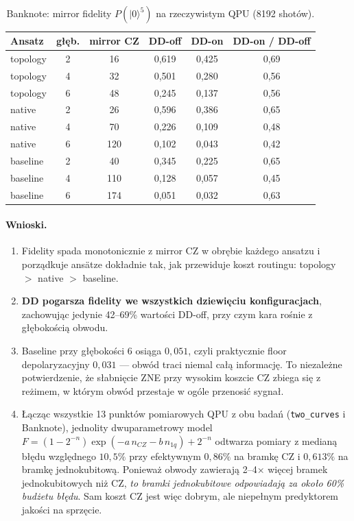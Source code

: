 \documentclass[11pt,a4paper]{article}
\begin{document}
\begin{table}[htbp]
\centering
\caption{Banknote: mirror fidelity $P(|0\rangle^{5})$ na rzeczywistym QPU (8192 shotów).}
\begin{tabular}{@{}lccc cc@{}}
\toprule
Ansatz & głęb. & mirror CZ & DD-off & DD-on & DD-on / DD-off \\
\midrule
topology & 2 & 16  & 0,619 & 0,425 & 0,69 \\
topology & 4 & 32  & 0,501 & 0,280 & 0,56 \\
topology & 6 & 48  & 0,245 & 0,137 & 0,56 \\
\midrule
native   & 2 & 26  & 0,596 & 0,386 & 0,65 \\
native   & 4 & 70  & 0,226 & 0,109 & 0,48 \\
native   & 6 & 120 & 0,102 & 0,043 & 0,42 \\
\midrule
baseline & 2 & 40  & 0,345 & 0,225 & 0,65 \\
baseline & 4 & 110 & 0,128 & 0,057 & 0,45 \\
baseline & 6 & 174 & 0,051 & 0,032 & 0,63 \\
\bottomrule
\end{tabular}
\end{table}

\FloatBarrier
\paragraph{Wnioski.}
\begin{enumerate}
\item Fidelity spada monotonicznie z mirror CZ w obrębie każdego ansatzu i porządkuje ansätze
      dokładnie tak, jak przewiduje koszt routingu: topology $>$ native $>$ baseline.
\item \textbf{DD pogarsza fidelity we wszystkich dziewięciu konfiguracjach}, zachowując
      jedynie 42--69\% wartości DD-off, przy czym kara rośnie z głębokością obwodu.
\item Baseline przy głębokości 6 osiąga $0{,}051$, czyli praktycznie floor
      depolaryzacyjny $0{,}031$ --- obwód traci niemal całą informację. To niezależne
      potwierdzenie, że słabnięcie ZNE przy wysokim koszcie CZ zbiega się z reżimem, w którym
      obwód przestaje w ogóle przenosić sygnał.
\item Łącząc wszystkie 13 punktów pomiarowych QPU z obu badań (\texttt{two\_curves}
      i Banknote), jednolity dwuparametrowy model
      $F = (1-2^{-n})\exp(-a\,n_{CZ} - b\,n_{1q}) + 2^{-n}$ odtwarza pomiary z medianą błędu
      względnego $10{,}5\%$ przy efektywnym $0{,}86\%$ na bramkę CZ i $0{,}613\%$ na bramkę
      jednokubitową. Ponieważ obwody zawierają 2--4$\times$ więcej bramek jednokubitowych niż
      CZ, \emph{to bramki jednokubitowe odpowiadają za około 60\% budżetu błędu}. Sam koszt
      CZ jest więc dobrym, ale niepełnym predyktorem jakości na sprzęcie.
\end{enumerate}
\end{document}

